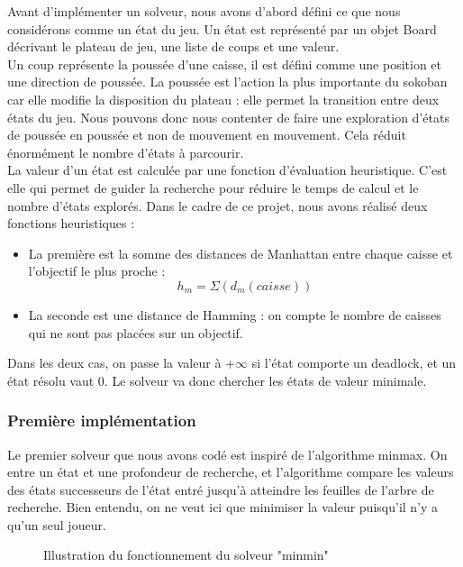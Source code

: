 \documentclass[a4paper,12pt]{article} %
\begin{document}
Avant d'implémenter un solveur, nous avons d'abord défini ce que nous considérons comme un état du jeu. Un état est représenté par un objet Board décrivant le plateau de jeu, une liste de coups et une valeur.\\
Un coup représente la poussée d'une caisse, il est défini comme une position et une direction de poussée. La poussée est l'action la plus importante du sokoban car elle modifie la disposition du plateau : elle permet la transition entre deux états du jeu.
Nous pouvons donc nous contenter de faire une exploration d'états de poussée en poussée et non de mouvement en mouvement. Cela réduit énormément le nombre d'états à parcourir.\\
La valeur d'un état est calculée par une fonction d'évaluation heuristique. C'est elle qui permet de guider la recherche pour réduire le temps de calcul et le nombre d'états explorés. Dans le cadre de ce projet, nous avons réalisé deux fonctions heuristiques :\\
\begin{itemize}
\item La première est la somme des distances de Manhattan entre chaque caisse et l'objectif le plus proche : $$h_m= \Sigma(d_m(caisse))$$
\item La seconde est une distance de Hamming : on compte le nombre de caisses qui ne sont pas placées sur un objectif.
\end{itemize}
Dans les deux cas, on passe la valeur à +$\infty$ si l'état comporte un deadlock, et un état résolu vaut 0. Le solveur va donc chercher les états de valeur minimale.\\

\subsubsection{Première implémentation}

Le premier solveur que nous avons codé est inspiré de l'algorithme minmax. On entre un état et une profondeur de recherche, et l'algorithme compare les valeurs des états successeurs de l'état entré jusqu'à atteindre les feuilles de l'arbre de recherche. Bien entendu, on ne veut ici que minimiser la valeur puisqu'il n'y a qu'un seul joueur.

\begin{figure}[!h]
\centering
{}
\caption{Illustration du fonctionnement du solveur "minmin"}
\end{figure}
\end{document}
